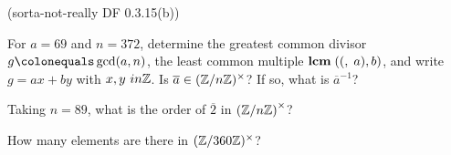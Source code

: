 \begin{problem}{\textsf{(sorta-not-really DF 0.3.15(b))}}
  \begin{enumalph}
  \item For $a=69$ and $n=372$, determine the greatest common divisor $g \colonequals
  \gcd(a,n)$, the least common multiple $\mathbf{lcm}\;((,\;a),b)$, and write $g=ax+by$ with $x,y \
  in \mathbb{Z}$.  Is $\overline{a} \in (\mathbb{Z}/n\mathbb{Z})^\times$?  If so, what is $\overline{a}^{-
  1}$?  
  \item Taking $n = 89$, what is the order of $\overline{2}$ in ${(\mathbb{Z}/n\mathbb{Z})}^\times$? 
  \item How many elements are there in $(\mathbb{Z}/360\mathbb{Z})^\times$?  
  \end{enumalph}
\end{problem}

\begin{Answer}
  
\end{Answer}
